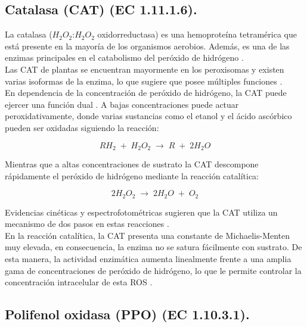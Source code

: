 \subsection{Catalasa (CAT) (EC 1.11.1.6).}

La catalasa ($H_2O_2$:$H_2O_2$ oxidorreductasa) es una hemoprote\'ina tetram\'erica que est\'a presente en la mayor\'ia de los organismos aerobios. Adem\'as, es una de las enzimas principales en el catabolismo del per\'oxido de hidr\'ogeno \citep{luhova2003activities}. \\

Las CAT de plantas se encuentran mayormente en los peroxisomas \citep{luhova2003activities} y existen varias isoformas de la enzima, lo que sugiere que posee m\'ultiples funciones \citep{scandalios1997catalases}.\\

En dependencia de la concentraci\'on de per\'oxido de hidr\'ogeno, la CAT puede ejercer una funci\'on dual \citep{deisseroth1970catalase}. A bajas concentraciones puede actuar peroxidativamente, donde varias sustancias como el etanol y el \'acido asc\'orbico pueden ser oxidadas siguiendo la reacci\'on:

$$RH_2 \; +\; H_2O_2 \; \rightarrow \; R \; + \; 2H_2O $$

Mientras que a altas concentraciones de sustrato la CAT descompone r\'apidamente el per\'oxido de hidr\'ogeno mediante la reacci\'on catal\'itica:

$$2H_2O_2 \; \rightarrow \; 2H_2O \; + \; O_2$$

Evidencias cin\'eticas y espectrofotom\'etricas sugieren que la CAT utiliza un mecanismo de dos pasos en estas reacciones \citep{deisseroth1970catalase, dounce1983proposed}. \\

En la reacci\'on catal\'itica, la CAT presenta una constante de Michaelis-Menten muy elevada, en consecuencia, la enzima no se satura f\'acilmente con sustrato. De esta manera, la actividad enzim\'atica aumenta linealmente frente a una amplia gama de concentraciones de per\'oxido de hidr\'ogeno, lo que le permite controlar la concentraci\'on intracelular de esta ROS \citep{scandalios1997catalases}.\\




\subsection{Polifenol oxidasa (PPO) (EC 1.10.3.1).}

